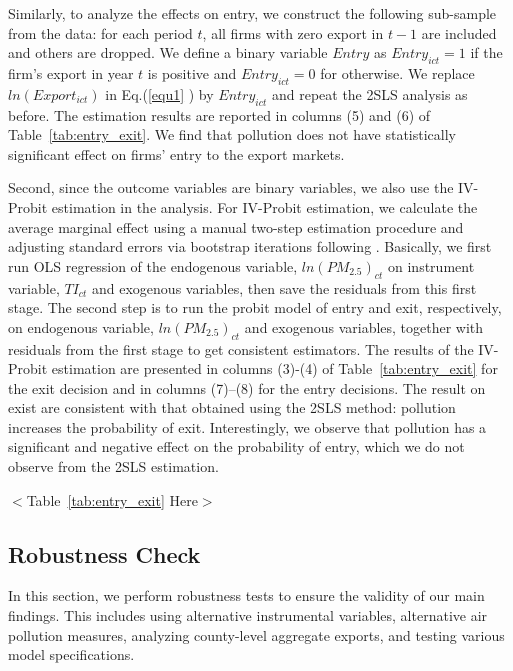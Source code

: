 \documentclass[12pt]{article}
\begin{document}
Similarly, to analyze the effects on entry, we construct the following
sub-sample from the data: for each period $t$, all firms with zero export in 
$t-1$ are included and others are dropped. We define a binary variable $%
Entry $ as $Entry_{ict}=1$ if the firm's export in year $t$ is positive and $%
Entry_{ict}=0$ for otherwise. We replace $ln(Export_{ict})$ in Eq.(\ref{equ1}%
) by $Entry_{ict}$ and repeat the 2SLS analysis as before. The estimation
results are reported in columns (5) and (6) of Table~\ref{tab:entry_exit}. We find that
pollution does not have statistically significant effect on firms' entry to
the export markets.

Second, since the outcome variables are binary variables, we also use the
IV-Probit estimation in the analysis. For IV-Probit estimation, we calculate the 
average marginal effect using a manual two-step estimation procedure and adjusting standard errors via bootstrap iterations 
following \citep{wooldridge2010econometric}. Basically, we
first run OLS regression of the endogenous variable, $ln(PM_{2.5})_{ct}$ on
instrument variable, $TI_{ct}$ and exogenous variables, then
save the residuals from this first stage. The second step is to run the probit
model of entry and exit, respectively, on endogenous variable, $ln(PM_{2.5})_{ct}$ and exogenous variables, together with residuals from the first stage to get consistent estimators. 
The results of the IV-Probit estimation are presented in columns (3)-(4) of Table~\ref{tab:entry_exit} for the exit decision and in 
columns (7)--(8) for the entry decisions. The result on exist are consistent with that obtained using the 2SLS method: pollution increases the probability of exit. Interestingly, we observe that pollution has a significant and negative effect on the probability of entry, which we do not observe from the 2SLS estimation. 

\begin{center}
  $<$Table~\ref{tab:entry_exit} Here$>$
\end{center}

\subsection{Robustness Check}

In this section, we perform robustness tests to ensure the validity of our main findings. This includes using alternative instrumental variables, alternative air pollution measures, analyzing county-level aggregate exports, and testing various model specifications.
\end{document}
